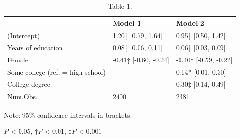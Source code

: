 \begin{table}[!t]
\centering
\caption{Table 1.}
\begin{threeparttable}
\begin{tabular}{lll}
\toprule
& Model 1 & Model 2 \\ \midrule
(Intercept) & 1.20‡ [0.79, 1.64] & 0.95‡ [0.50, 1.42] \\
Years of education & 0.08‡ [0.06, 0.11] & 0.06‡ [0.03, 0.09] \\
Female & -0.41‡ [-0.60, -0.24] & -0.40‡ [-0.59, -0.22] \\
Some college (ref. = high school) &  & 0.14* [0.01, 0.30] \\
College degree &  & 0.30‡ [0.14, 0.49] \\
Num.Obs. & 2400 & 2381 \\
\bottomrule
\end{tabular}
\begin{tablenotes}[flushleft]\footnotesize
\item Note: 95\% confidence intervals in brackets.
\item *\textit{P} < 0.05, †\textit{P} < 0.01, ‡\textit{P} < 0.001
\end{tablenotes}
\end{threeparttable}
\end{table}

